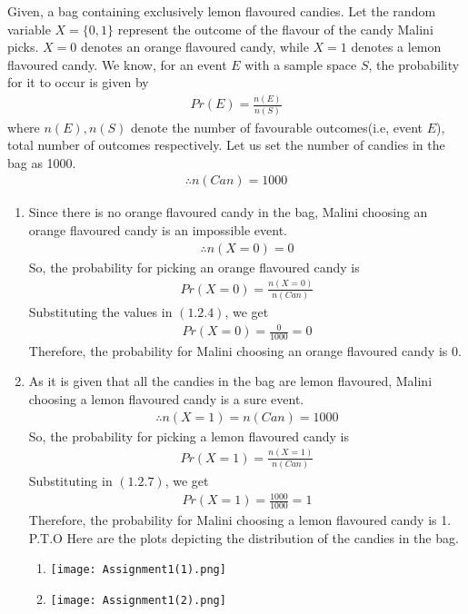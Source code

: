 \documentclass[journal,12pt,twocolumn]{IEEEtran}
\begin{document}
Given, a bag containing exclusively lemon flavoured candies. Let the random variable $X=\{0,1\}$ represent the outcome of the flavour of the candy Malini picks. $X=0$ denotes an orange flavoured candy, while $X=1$ denotes a lemon flavoured candy.
\newline
\newline
We know, for an event $E$ with a sample space $S$, the probability for it to occur is given by 
\begin{align}
\tag{1.2.1}
    Pr(E)=\frac{n(E)}{n(S)}
\end{align}
where $n(E),n(S)$ denote the number of favourable outcomes(i.e, event $E$), total number of outcomes respectively.
\newline
\newline
Let us set the number of candies in the bag as 1000.
\begin{align}
    \tag{1.2.2}
    \therefore n(Can)=1000
    \end{align}
\begin{enumerate}
    \item Since there is no orange flavoured candy in the bag, Malini choosing an orange flavoured candy is an impossible event. 
    \begin{align}
    \tag{1.2.3}
    \therefore n(X=0)=0
    \end{align}
    So, the probability for picking an orange flavoured candy is
    \begin{align}
    \tag{1.2.4}
    Pr(X=0)=\frac{n(X=0)}{n(Can)}
    \end{align}
    Substituting the values in $(1.2.4)$, we get
    \begin{align}
    \tag{1.2.5}
    Pr(X=0)=\frac{0}{1000}=0
    \end{align}
    Therefore, the probability for Malini choosing an orange flavoured candy is 0.
    \item As it is given that all the candies in the bag are lemon flavoured, Malini choosing a lemon flavoured candy is a sure event. 
    \begin{align}
    \tag{1.2.6}
    \therefore n(X=1)=n(Can)=1000
    \end{align}
    So, the probability for picking a lemon flavoured candy is
    \begin{align}
    \tag{1.2.7}
    Pr(X=1)=\frac{n(X=1)}{n(Can)}
    \end{align}
    Substituting in $(1.2.7)$, we get
    \begin{align}
    \tag{1.2.8}
    Pr(X=1)=\frac{1000}{1000}=1
    \end{align}
    Therefore, the probability for Malini choosing a lemon flavoured candy is 1.
    \newline
    \newline
    P.T.O
    \newpage
    Here are the plots depicting the distribution of the candies in the bag.
    \begin{enumerate}
        \item \texttt{[image: Assignment1(1).png]}
        \item \texttt{[image: Assignment1(2).png]}
    \end{enumerate}
\end{enumerate}
\end{document}
